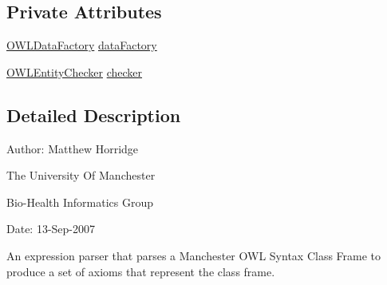 \subsection*{Private Attributes}
\begin{DoxyCompactItemize}
\item 
\hyperlink{interfaceorg_1_1semanticweb_1_1owlapi_1_1model_1_1_o_w_l_data_factory}{O\-W\-L\-Data\-Factory} \hyperlink{classorg_1_1coode_1_1owlapi_1_1manchesterowlsyntax_1_1_manchester_o_w_l_syntax_class_frame_parser_a7c0f6c1da45f4620640609d9b4227c2b}{data\-Factory}
\item 
\hyperlink{interfaceorg_1_1semanticweb_1_1owlapi_1_1expression_1_1_o_w_l_entity_checker}{O\-W\-L\-Entity\-Checker} \hyperlink{classorg_1_1coode_1_1owlapi_1_1manchesterowlsyntax_1_1_manchester_o_w_l_syntax_class_frame_parser_aaf2f055752305d339ee0d0a9d739d515}{checker}
\end{DoxyCompactItemize}


\subsection{Detailed Description}
Author\-: Matthew Horridge\par
 The University Of Manchester\par
 Bio-\/\-Health Informatics Group\par
 Date\-: 13-\/\-Sep-\/2007\par
\par


An expression parser that parses a Manchester O\-W\-L Syntax Class Frame to produce a set of axioms that represent the class frame. 


